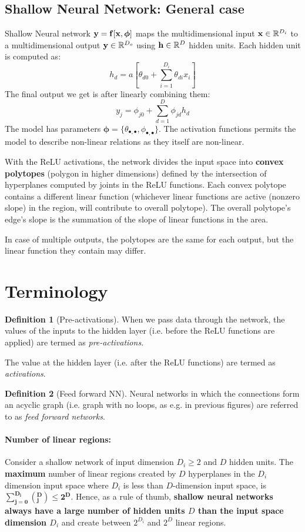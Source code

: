 \documentclass[12pt,reqno]{amsart}
\theoremstyle{plain}
\theoremstyle{definition}
\newtheorem{defn}{Definition}
\newcommand{\bb}[1]{\mathbb{#1}}
\begin{document}
\subsection{Shallow Neural Network: General case}
Shallow Neural network ${\bf y = f[x, \boldsymbol{\phi}]}$ maps the multidimensional input ${\bf x} \in \bb R^{D_i}$ to a multidimensional output ${\bf y}\in \bb R^{D_o}$ using ${\bf h} \in \bb R^D$ hidden units. Each hidden unit is computed as:
$$ h_d = a\left[\theta_{d0} + \sum\limits_{i=1}^{D_i}\theta_{di}x_i\right] $$
The final output we get is after linearly combining them:
$$y_j = \phi_{j0} + \sum\limits_{d=1}^{D}\phi_{jd}h_d $$
The model has parameters $\boldsymbol{\phi} = \{\theta_{\bullet, \bullet},\phi_{\bullet, \bullet}\}$. The activation functions permits the model to describe non-linear relations as they itself are non-linear.

With the ReLU activations, the network divides the input space into {\bf convex polytopes} (polygon in higher dimensions) defined by the intersection of hyperplanes computed by joints in the ReLU functions. Each convex polytope contains a different linear function (whichever linear functions are active (nonzero slope) in the region, will contribute to overall polytope). The overall polytope's edge's slope is the summation of the slope of linear functions in the area.

In case of multiple outputs, the polytopes are the same for each output, but the linear function they contain may differ.

\section{Terminology}
\begin{defn}[Pre-activations]
    When we pass data through the network, the values of the inputs to the hidden layer (i.e. before the ReLU functions are applied) are termed as {\it pre-activations}.

    The value at the hidden layer (i.e. after the ReLU functions) are termed as {\it activations}.
\end{defn}
\begin{defn}[Feed forward NN]
    Neural networks in which the connections form an acyclic graph (i.e. graph with no loops, as e.g. in previous figures) are referred to as {\it feed forward networks}.
\end{defn}
\paragraph{\bf Number of linear regions:} Consider a shallow network of input dimension $D_i \geq 2$ and $D$ hidden units. The {\bf maximum} number of linear regions created by $D$ hyperplanes in the $D_i$ dimension input space where $D_i$ is less than $D$-dimension input space, is $\mathbf{\sum\limits_{j=0}^{D_i} (^D_j) \leq 2^{D}}$. Hence, as a rule of thumb, {\bf shallow neural networks always have a large number of hidden units $D$ than the input space dimension $D_i$} and create between $2^{D_i}$ and $2^{D}$ linear regions.
\end{document}
